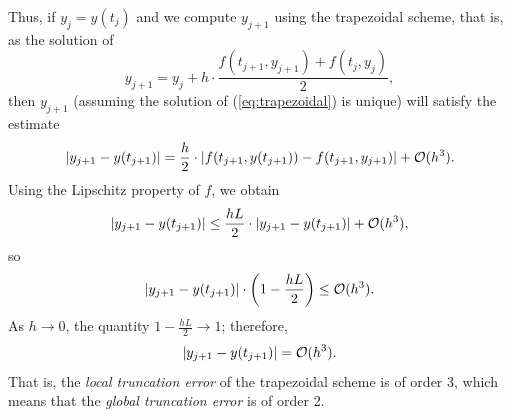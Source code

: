 \documentclass{homework}
\begin{document}
	Thus, if $y_j = y(t_j)$ and we compute $y_{j+1}$ using the trapezoidal scheme, that is, as the solution of
	\begin{equation}
		\label{eq:trapezoidal}
		y_{j+1} = y_j + h\cdot\frac{f(t_{j+1}, y_{j+1}) + f(t_j, y_j)}{2},
	\end{equation}
	then $y_{j+1}$ (assuming the solution of (\ref{eq:trapezoidal}) is unique) will satisfy the estimate
	\begin{equation}
		|y_{j+1} - y(t_{j+1})| = \frac{h}{2}\cdot|f(t_{j+1}, y(t_{j+1})) - f(t_{j+1}, y_{j+1})| + \mathcal{O}(h^3).
	\end{equation}
	Using the Lipschitz property of $f$, we obtain
	\begin{equation}
		|y_{j+1} - y(t_{j+1})| \le \frac{hL}{2}\cdot|y_{j+1} - y(t_{j+1})| + \mathcal{O}(h^3),
	\end{equation}
	so
	\begin{equation}
		|y_{j+1}-y(t_{j+1})| \cdot\left(1 - \frac{hL}{2}\right) \le \mathcal{O}(h^3).
	\end{equation}
	As $h \to 0$, the quantity $1 - \frac{hL}{2} \to 1$; therefore,
	\begin{equation}
		|y_{j+1} - y(t_{j+1})| = \mathcal{O}(h^3).
	\end{equation}
	That is, the \textit{local truncation error} of the trapezoidal scheme is of order 3, which means that the \textit{global truncation error} is of order 2.
	
\end{document}
